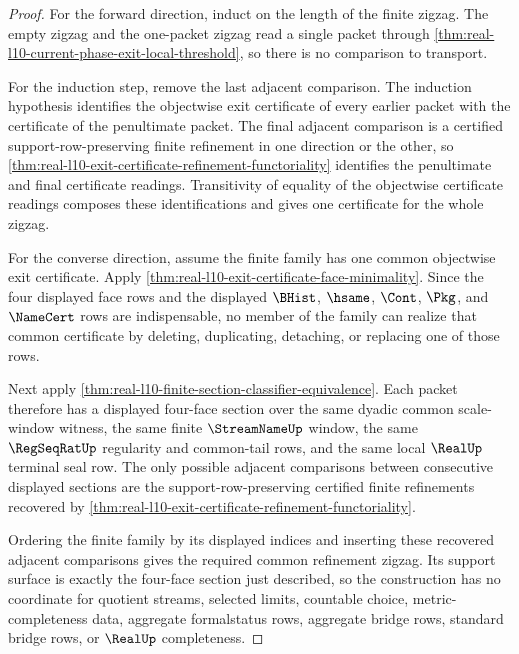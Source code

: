 \begin{proof}
For the forward direction, induct on the length of the finite zigzag. The empty zigzag and the one-packet zigzag read a single packet through \autoref{thm:real-l10-current-phase-exit-local-threshold}, so there is no comparison to transport.

For the induction step, remove the last adjacent comparison. The induction hypothesis identifies the objectwise exit certificate of every earlier packet with the certificate of the penultimate packet. The final adjacent comparison is a certified support-row-preserving finite refinement in one direction or the other, so \autoref{thm:real-l10-exit-certificate-refinement-functoriality} identifies the penultimate and final certificate readings. Transitivity of equality of the objectwise certificate readings composes these identifications and gives one certificate for the whole zigzag.

For the converse direction, assume the finite family has one common objectwise exit certificate. Apply \autoref{thm:real-l10-exit-certificate-face-minimality}. Since the four displayed face rows and the displayed $\BHist$, $\hsame$, $\Cont$, $\Pkg$, and $\NameCert$ rows are indispensable, no member of the family can realize that common certificate by deleting, duplicating, detaching, or replacing one of those rows.

Next apply \autoref{thm:real-l10-finite-section-classifier-equivalence}. Each packet therefore has a displayed four-face section over the same dyadic common scale-window witness, the same finite $\StreamNameUp$ window, the same $\RegSeqRatUp$ regularity and common-tail rows, and the same local $\RealUp$ terminal seal row. The only possible adjacent comparisons between consecutive displayed sections are the support-row-preserving certified finite refinements recovered by \autoref{thm:real-l10-exit-certificate-refinement-functoriality}.

Ordering the finite family by its displayed indices and inserting these recovered adjacent comparisons gives the required common refinement zigzag. Its support surface is exactly the four-face section just described, so the construction has no coordinate for quotient streams, selected limits, countable choice, metric-completeness data, aggregate formalstatus rows, aggregate bridge rows, standard bridge rows, or $\RealUp$ completeness.
\end{proof}

